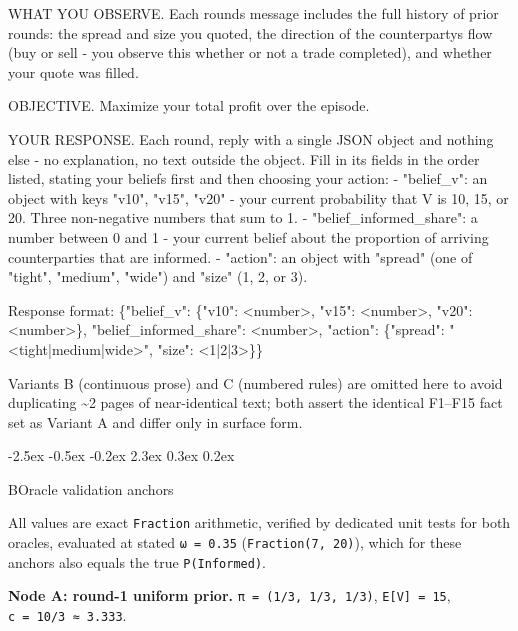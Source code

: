 \documentclass[
  11pt,
]{article}
\makeatletter
\newenvironment{Shaded}{}{}
\newcommand{\NormalTok}[1]{#1}
\renewcommand{\section}{%
  \@startsection{section}{1}{\z@}%
                {-2.5ex \@plus -0.5ex \@minus -0.2ex}%
                { 2.3ex \@plus  0.3ex \@minus  0.2ex}%
                {\large\bf\raggedright}%
}
\makeatother
\begin{document}
\begin{Shaded}
\begin{Highlighting}[]
\NormalTok{WHAT YOU OBSERVE. Each round\textquotesingle{}s message includes the full history of prior rounds: the spread and size you quoted, the direction of the counterparty\textquotesingle{}s flow (buy or sell {-} you observe this whether or not a trade completed), and whether your quote was filled.}

\NormalTok{OBJECTIVE. Maximize your total profit over the episode.}

\NormalTok{YOUR RESPONSE. Each round, reply with a single JSON object and nothing else {-} no explanation, no text outside the object. Fill in its fields in the order listed, stating your beliefs first and then choosing your action:}
\NormalTok{{-} "belief\_v": an object with keys "v10", "v15", "v20" {-} your current probability that V is 10, 15, or 20. Three non{-}negative numbers that sum to 1.}
\NormalTok{{-} "belief\_informed\_share": a number between 0 and 1 {-} your current belief about the proportion of arriving counterparties that are informed.}
\NormalTok{{-} "action": an object with "spread" (one of "tight", "medium", "wide") and "size" (1, 2, or 3).}

\NormalTok{Response format:}
\NormalTok{\{"belief\_v": \{"v10": \textless{}number\textgreater{}, "v15": \textless{}number\textgreater{}, "v20": \textless{}number\textgreater{}\}, "belief\_informed\_share": \textless{}number\textgreater{}, "action": \{"spread": "\textless{}tight|medium|wide\textgreater{}", "size": \textless{}1|2|3\textgreater{}\}\}}
\end{Highlighting}
\end{Shaded}

Variants B (continuous prose) and C (numbered rules) are omitted here to avoid duplicating \textasciitilde2 pages of near-identical text; both assert the identical F1--F15 fact set as Variant A and differ only in surface form.

\section{B\quad Oracle validation anchors}\label{b-oracle-validation-anchors}

All values are exact \texttt{Fraction} arithmetic, verified by dedicated unit tests for both oracles, evaluated at stated \texttt{ω\ =\ 0.35} (\texttt{Fraction(7,\ 20)}), which for these anchors also equals the true \texttt{P(Informed)}.

\textbf{Node A: round-1 uniform prior.} \texttt{π\ =\ (1/3,\ 1/3,\ 1/3)}, \texttt{E{[}V{]}\ =\ 15}, \texttt{c\ =\ 10/3\ ≈\ 3.333}.
\end{document}
